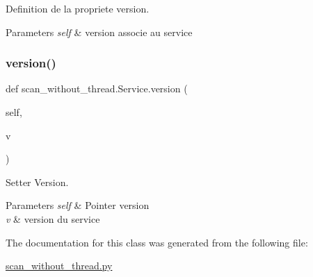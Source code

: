 Definition de la propriete version. 


\begin{DoxyParams}{Parameters}
{\em self} & version associe au service \\
\hline
\end{DoxyParams}
\hypertarget{classscan__without__thread_1_1Service_ad363d91f916c412b94e3d8a06f09ffe0}{}\label{classscan__without__thread_1_1Service_ad363d91f916c412b94e3d8a06f09ffe0} 
\subsubsection{\texorpdfstring{version()}{version()}\hspace{0.1cm}{\footnotesize\ttfamily [2/2]}}
{\footnotesize\ttfamily def scan\+\_\+without\+\_\+thread.\+Service.\+version (\begin{DoxyParamCaption}\item[{}]{self,  }\item[{}]{v }\end{DoxyParamCaption})}



Setter Version. 


\begin{DoxyParams}{Parameters}
{\em self} & Pointer version \\
\hline
{\em v} & version du service \\
\hline
\end{DoxyParams}


The documentation for this class was generated from the following file\+:\begin{DoxyCompactItemize}
\item 
\hyperlink{scan__without__thread_8py}{scan\+\_\+without\+\_\+thread.\+py}\end{DoxyCompactItemize}

